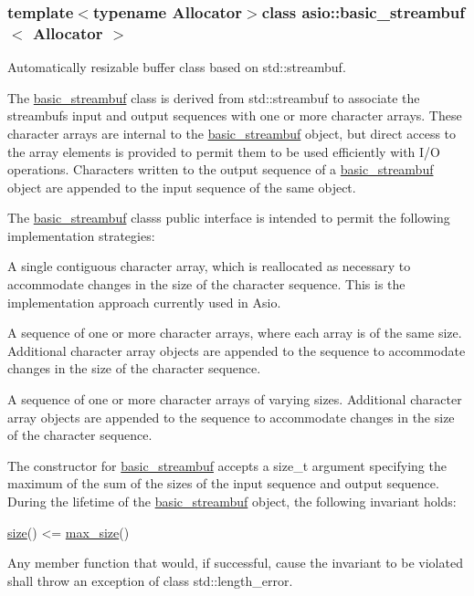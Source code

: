 \subsubsection*{template$<$typename Allocator$>$class asio\+::basic\+\_\+streambuf$<$ Allocator $>$}

Automatically resizable buffer class based on std\+::streambuf. 

The {\ttfamily \hyperlink{classasio_1_1basic__streambuf}{basic\+\_\+streambuf}} class is derived from {\ttfamily std\+::streambuf} to associate the streambuf\textquotesingle{}s input and output sequences with one or more character arrays. These character arrays are internal to the {\ttfamily \hyperlink{classasio_1_1basic__streambuf}{basic\+\_\+streambuf}} object, but direct access to the array elements is provided to permit them to be used efficiently with I/\+O operations. Characters written to the output sequence of a {\ttfamily \hyperlink{classasio_1_1basic__streambuf}{basic\+\_\+streambuf}} object are appended to the input sequence of the same object.

The {\ttfamily \hyperlink{classasio_1_1basic__streambuf}{basic\+\_\+streambuf}} class\textquotesingle{}s public interface is intended to permit the following implementation strategies\+:

\begin{DoxyItemize}
\item A single contiguous character array, which is reallocated as necessary to accommodate changes in the size of the character sequence. This is the implementation approach currently used in Asio.\end{DoxyItemize}
\begin{DoxyItemize}
\item A sequence of one or more character arrays, where each array is of the same size. Additional character array objects are appended to the sequence to accommodate changes in the size of the character sequence.\end{DoxyItemize}
\begin{DoxyItemize}
\item A sequence of one or more character arrays of varying sizes. Additional character array objects are appended to the sequence to accommodate changes in the size of the character sequence.\end{DoxyItemize}
The constructor for \hyperlink{classasio_1_1basic__streambuf}{basic\+\_\+streambuf} accepts a {\ttfamily size\+\_\+t} argument specifying the maximum of the sum of the sizes of the input sequence and output sequence. During the lifetime of the {\ttfamily \hyperlink{classasio_1_1basic__streambuf}{basic\+\_\+streambuf}} object, the following invariant holds\+: 
\begin{DoxyCode}
\hyperlink{classasio_1_1basic__streambuf_a18183b8bfcb9a7cda8c467c80d578e69}{size}() <= \hyperlink{classasio_1_1basic__streambuf_aee4f81154657df05c5c01cc732fe8a3a}{max\_size}()
\end{DoxyCode}
 Any member function that would, if successful, cause the invariant to be violated shall throw an exception of class {\ttfamily std\+::length\+\_\+error}.

